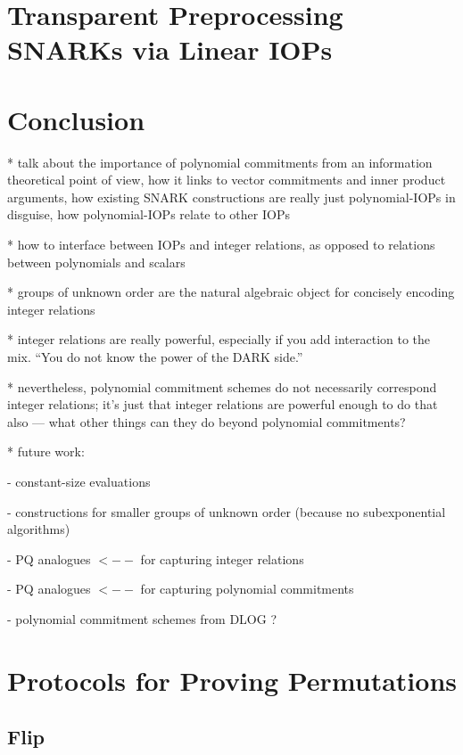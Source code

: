 \documentclass{article}
\theoremstyle{definition}
\begin{document}
\section{Transparent Preprocessing SNARKs via Linear IOPs} 


\section{Conclusion}

 * talk about the importance of polynomial commitments from an information theoretical point of view, how it links to vector commitments and inner product arguments, how existing SNARK constructions are really just polynomial-IOPs in disguise, how polynomial-IOPs relate to other IOPs
 
 * how to interface between IOPs and integer relations, as opposed to relations between polynomials and scalars 
 
 * groups of unknown order are the natural algebraic object for concisely encoding integer relations
 
 * integer relations are really powerful, especially if you add interaction to the mix. ``You do not know the power of the DARK side.''
 
 * nevertheless, polynomial commitment schemes do not necessarily correspond integer relations; it's just that integer relations are powerful enough to do that also --- what other things can they do beyond polynomial commitments?
 
 * future work:
 
  - constant-size evaluations
  
  - constructions for smaller groups of unknown order (because no subexponential algorithms)
  
  - PQ analogues $<--$ for capturing integer relations
  
  - PQ analogues $<--$ for capturing polynomial commitments
  
  - polynomial commitment schemes from DLOG ?

%

  

\appendix


\section{Protocols for Proving Permutations}


\subsection{Flip}
\end{document}
